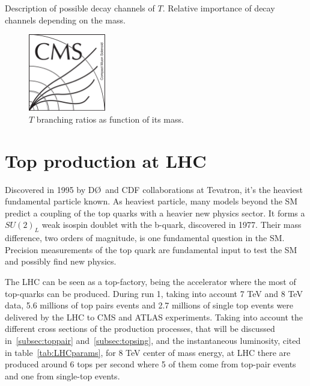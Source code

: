Description of possible decay channels of $T$. Relative importance of decay channels depending on the mass. 

\begin{figure}[!Hhtbp]
  \begin{center}
    \includegraphics[width=0.3\textwidth]{figs/CMSlogo.png}
    \caption{$T$ branching ratios as function of its mass.}
    \label{fig:TBRs}
  \end{center}
\end{figure}

\section{Top production at LHC}

Discovered in 1995 by D\O~and CDF collaborations at Tevatron, it's the heaviest fundamental particle known. As heaviest particle, many models beyond the SM predict a coupling of the top quarks with a heavier new physics sector. It forms a $SU(2)_{L}$ weak isospin doublet with the b-quark, discovered in 1977. Their mass difference, two orders of magnitude, is one fundamental question in the SM. Precision measurements of the top quark are fundamental input to test the SM and possibly find new physics.

The LHC can be seen as a top-factory, being the accelerator where the most of top-quarks can be produced. During run 1, taking into account 7 TeV and 8 TeV data, 5.6 millions of top pairs events and 2.7 millions of single top events were delivered by the LHC to CMS and ATLAS experiments. Taking into account the different cross sections of the production processes, that will be discussed in~\ref{subsec:toppair} and~\ref{subsec:topsing}, and the instantaneous luminosity, cited in table~\ref{tab:LHCparams}, for 8 TeV center of mass energy, at LHC there are produced around 6 tops per second where 5 of them come from top-pair events and one from single-top events.  

